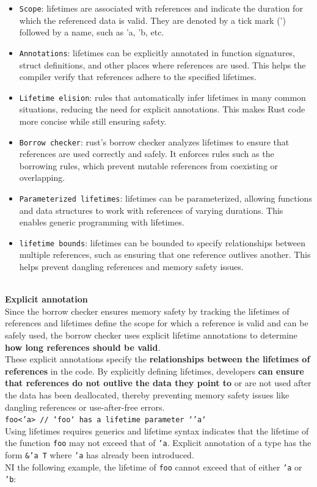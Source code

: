 \documentclass{article}
\begin{document}
\begin{itemize}
    \item \texttt{Scope}: lifetimes are associated with references and indicate the duration for which the referenced data is valid. They are denoted by a tick mark (') followed by a name, such as 'a, 'b, etc.
    \item \texttt{Annotations}: lifetimes can be explicitly annotated in function signatures, struct definitions, and other places where references are used. This helps the compiler verify that references adhere to the specified lifetimes.
    \item \texttt{Lifetime elision}: rules that automatically infer lifetimes in many common situations, reducing the need for explicit annotations. This makes Rust code more concise while still ensuring safety.
    \item \texttt{Borrow checker}: rust's borrow checker analyzes lifetimes to ensure that references are used correctly and safely. It enforces rules such as the borrowing rules, which prevent mutable references from coexisting or overlapping.
    \item \texttt{Parameterized lifetimes}: lifetimes can be parameterized, allowing functions and data structures to work with references of varying durations. This enables generic programming with lifetimes.
    \item \texttt{lifetime bounds}: lifetimes can be bounded to specify relationships between multiple references, such as ensuring that one reference outlives another. This helps prevent dangling references and memory safety issues.
\end{itemize}
\\

\textbf{Explicit annotation}\\
Since the borrow checker ensures memory safety by tracking the lifetimes of references and lifetimes define the scope for which a reference is valid and can be safely used, the borrow checker uses explicit lifetime annotations to determine \textbf{how long references should be valid}.
\\
These explicit annotations specify the \textbf{relationships between the lifetimes of references} in the code. By explicitly defining lifetimes, developers \textbf{can ensure that references do not outlive the data they point to} or are not used after the data has been deallocated, thereby preventing memory safety issues like dangling references or use-after-free errors.
\\
\texttt{foo<'a> // `foo` has a lifetime parameter `'a`}
\\
Using lifetimes requires generics and lifetime syntax indicates that the lifetime of the function \texttt{foo} may not exceed that of \texttt{'a}. Explicit annotation of a type has the form \texttt{\&'a T} where \texttt{'a} has already been introduced.\\
NI the following example, the lifetime of \texttt{foo} cannot exceed that of either \texttt{'a} or \texttt{'b}:
\end{document}

